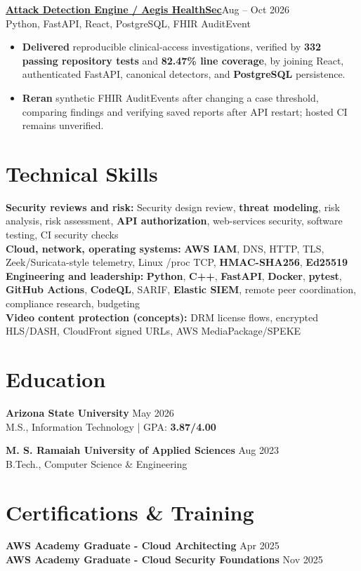 \documentclass[letterpaper,10pt]{article}
\newcommand{\proj}[3]{\noindent\textbf{#1}\hfill{\fontsize{10}{12}\selectfont #3}\\{\fontsize{10}{12}\selectfont #2}\vspace{1.5pt}}
\begin{document}
\proj{\href{https://github.com/poojakira/attack-detection-engine/blob/875299dd6a7ed061df792d1150371c688383fc05/release-evidence/RELEASE_ASSESSMENT.md}{Attack Detection Engine / Aegis HealthSec}}{Python, FastAPI, React, PostgreSQL, FHIR AuditEvent}{Aug -- Oct 2026}
\begin{itemize}
\item \textbf{Delivered} reproducible clinical-access investigations, verified by \textbf{332 passing repository tests} and \textbf{82.47\% line coverage}, by joining React, authenticated FastAPI, canonical detectors, and \textbf{PostgreSQL} persistence.
\item \textbf{Reran} synthetic FHIR AuditEvents after changing a case threshold, comparing findings and verifying saved reports after API restart; hosted CI remains unverified.
\end{itemize}

\vspace{1pt}

\section{Technical Skills}
{\fontsize{10.2}{12}\selectfont
\textbf{Security reviews and risk:} Security design review, \textbf{threat modeling}, risk analysis, risk assessment, \textbf{API authorization}, web-services security, software testing, CI security checks\\[2pt]
\textbf{Cloud, network, operating systems:} \textbf{AWS IAM}, DNS, HTTP, TLS, Zeek/Suricata-style telemetry, Linux /proc TCP, \textbf{HMAC-SHA256}, \textbf{Ed25519}\\[2pt]
\textbf{Engineering and leadership:} \textbf{Python}, \textbf{C++}, \textbf{FastAPI}, \textbf{Docker}, \textbf{pytest}, \textbf{GitHub Actions}, \textbf{CodeQL}, SARIF, \textbf{Elastic SIEM}, remote peer coordination, compliance research, budgeting\\[2pt]
\textbf{Video content protection (concepts):} DRM license flows, encrypted HLS/DASH, CloudFront signed URLs, AWS MediaPackage/SPEKE}

\section{Education}
\textbf{Arizona State University} \hfill May 2026\\
M.S., Information Technology | GPA: \textbf{3.87/4.00}\vspace{4pt}

\textbf{M. S. Ramaiah University of Applied Sciences} \hfill Aug 2023\\
B.Tech., Computer Science \& Engineering

\section{Certifications \& Training}
\textbf{AWS Academy Graduate - Cloud Architecting} \hfill Apr 2025\\[2pt]
\textbf{AWS Academy Graduate - Cloud Security Foundations} \hfill Nov 2025
\end{document}
